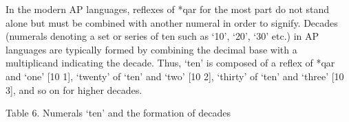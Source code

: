 In the modern AP languages, reflexes of *qar for the most part do not stand alone but must be combined with another numeral in order to signify. Decades (numerals denoting a set or series of ten such as {\textquoteleft}10{\textquoteright}, {\textquoteleft}20{\textquoteright}, {\textquoteleft}30{\textquoteright} etc.) in AP languages are typically formed by combining the decimal base with a multiplicand indicating the decade. Thus, {\textquoteleft}ten{\textquoteright} is composed of a reflex of *qar and {\textquoteleft}one{\textquoteright} [10 1], {\textquoteleft}twenty{\textquoteright} of {\textquoteleft}ten{\textquoteright} and {\textquoteleft}two{\textquoteright} [10 2], {\textquoteleft}thirty{\textquoteright} of {\textquoteleft}ten{\textquoteright} and {\textquoteleft}three{\textquoteright} [10 3], and so on for higher decades. 

{\centering
Table 6. Numerals {\textquoteleft}ten{\textquoteright} and the formation of decades
\par}

